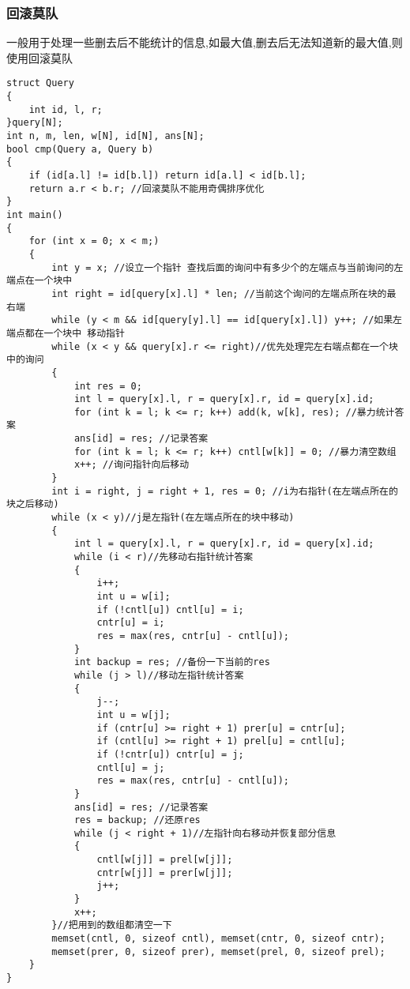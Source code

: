 \documentclass[a4paper, fontset=none]{ctexart}
\begin{document}
\subsubsection{回滚莫队}
一般用于处理一些删去后不能统计的信息,如最大值,删去后无法知道新的最大值,则使用回滚莫队
\begin{verbatim}
struct Query
{
    int id, l, r;
}query[N];
int n, m, len, w[N], id[N], ans[N];
bool cmp(Query a, Query b)
{
    if (id[a.l] != id[b.l]) return id[a.l] < id[b.l];
    return a.r < b.r; //回滚莫队不能用奇偶排序优化
}
int main()
{
    for (int x = 0; x < m;)
    {
        int y = x; //设立一个指针 查找后面的询问中有多少个的左端点与当前询问的左端点在一个块中
        int right = id[query[x].l] * len; //当前这个询问的左端点所在块的最右端
        while (y < m && id[query[y].l] == id[query[x].l]) y++; //如果左端点都在一个块中 移动指针
        while (x < y && query[x].r <= right)//优先处理完左右端点都在一个块中的询问
        {
            int res = 0;
            int l = query[x].l, r = query[x].r, id = query[x].id;
            for (int k = l; k <= r; k++) add(k, w[k], res); //暴力统计答案
            ans[id] = res; //记录答案
            for (int k = l; k <= r; k++) cntl[w[k]] = 0; //暴力清空数组
            x++; //询问指针向后移动
        }
        int i = right, j = right + 1, res = 0; //i为右指针(在左端点所在的块之后移动)
        while (x < y)//j是左指针(在左端点所在的块中移动)
        {
            int l = query[x].l, r = query[x].r, id = query[x].id;
            while (i < r)//先移动右指针统计答案
            {
                i++;
                int u = w[i];
                if (!cntl[u]) cntl[u] = i;
                cntr[u] = i;
                res = max(res, cntr[u] - cntl[u]);
            }
            int backup = res; //备份一下当前的res
            while (j > l)//移动左指针统计答案
            {
                j--;
                int u = w[j];
                if (cntr[u] >= right + 1) prer[u] = cntr[u];
                if (cntl[u] >= right + 1) prel[u] = cntl[u];
                if (!cntr[u]) cntr[u] = j;
                cntl[u] = j;
                res = max(res, cntr[u] - cntl[u]);
            }
            ans[id] = res; //记录答案
            res = backup; //还原res
            while (j < right + 1)//左指针向右移动并恢复部分信息
            {
                cntl[w[j]] = prel[w[j]];
                cntr[w[j]] = prer[w[j]];
                j++;
            }
            x++;
        }//把用到的数组都清空一下
        memset(cntl, 0, sizeof cntl), memset(cntr, 0, sizeof cntr);
        memset(prer, 0, sizeof prer), memset(prel, 0, sizeof prel);
    }
}
\end{verbatim}
\end{document}
